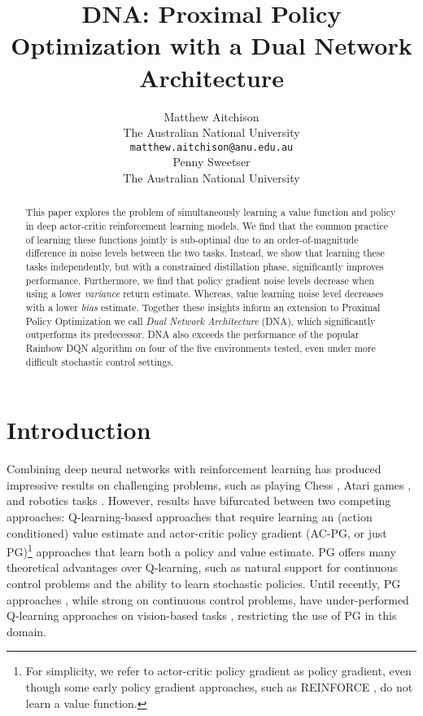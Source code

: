 \documentclass{article}
\title{DNA: Proximal Policy Optimization with a Dual Network Architecture}
\author{Matthew Aitchison\\
  The Australian National University\\
  \texttt{matthew.aitchison@anu.edu.au} \\
  \And
  Penny Sweetser\\
  The Australian National University\\
}
\begin{document}
\maketitle







\begin{abstract}
This paper explores the problem of simultaneously learning a value function and policy in deep actor-critic reinforcement learning models. We find that the common practice of learning these functions jointly is sub-optimal due to an order-of-magnitude difference in noise levels between the two tasks. Instead, we show that learning these tasks independently, but with a constrained distillation phase, significantly improves performance. Furthermore, we find that policy gradient noise levels decrease when using a lower \textit{variance} return estimate. Whereas, value learning noise level decreases with a lower \textit{bias} estimate. Together these insights inform an extension to Proximal Policy Optimization we call \textit{Dual Network Architecture} (DNA), which significantly outperforms its predecessor. DNA also exceeds the performance of the popular Rainbow DQN algorithm on four of the five environments tested, even under more difficult stochastic control settings.
\end{abstract}

\section{Introduction}

Combining deep neural networks with reinforcement learning has produced impressive results on challenging problems, such as playing Chess \cite{silver2018general}, Atari games \cite{mnih2015human}, and robotics tasks \cite{schulman2017proximal}. However, results have bifurcated between two competing approaches: Q-learning-based approaches that require learning an (action conditioned) value estimate and actor-critic policy gradient (AC-PG, or just PG)\footnote{For simplicity, we refer to actor-critic policy gradient as policy gradient, even though some early policy gradient approaches, such as REINFORCE \cite{williams1992simple}, do not learn a value function.} approaches that learn both a policy and value estimate. PG offers many theoretical advantages over Q-learning, such as natural support for continuous control problems and the ability to learn stochastic policies. Until recently, PG approaches \cite{mnih2016asynchronous, schulman2017proximal, cobbe2021phasic}, while strong on continuous control problems, have under-performed Q-learning approaches on vision-based tasks \cite{mnih2015human, hessel2018rainbow, badia2020agent57}, restricting the use of PG in this domain.
\end{document}
